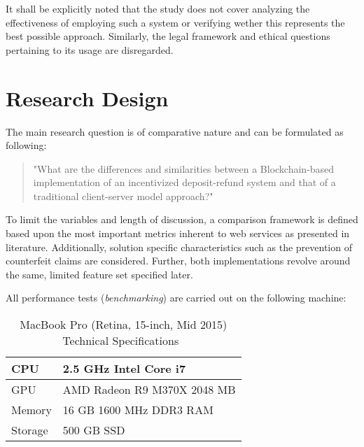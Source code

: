 It shall be explicitly noted that the study does not cover analyzing the effectiveness of employing such a system or verifying wether this represents the best possible approach. Similarly, the legal framework and ethical questions pertaining to its usage are disregarded.



\section{Research Design}
The main research question is of comparative nature and can be formulated as following: 

\begin{quote}
	"What are the differences and similarities between a Blockchain-based implementation of an incentivized deposit-refund system and that of a traditional client-server model approach?"
\end{quote}

To limit the variables and length of discussion, a comparison framework is defined based upon the most important metrics inherent to web services as presented in literature. Additionally, solution specific characteristics such as the prevention of counterfeit claims are considered. Further, both implementations revolve around the same, limited feature set specified later.

\pagebreak

All performance tests (\textit{benchmarking}) are carried out on the following machine:

\begin{table}[hbt]
	\centering
	\begin{tabular}{l|l}
		CPU & 2.5 GHz Intel Core i7 \\
		\hline
		GPU & AMD Radeon R9 M370X 2048 MB \\
		\hline
		Memory & 16 GB 1600 MHz DDR3 RAM \\
		\hline
		Storage & 500 GB SSD \\
	\end{tabular}
	\caption{MacBook Pro (Retina, 15-inch, Mid 2015) Technical Specifications~\cite{macbookproSpecifications}}
\end{table}

